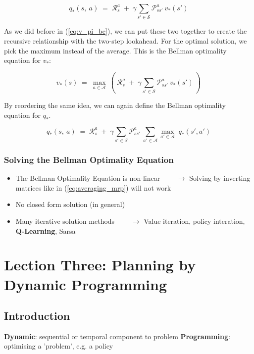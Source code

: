 \documentclass[10pt]{article}
\begin{document}
\begin{equation}
q_{*}(s,\:a)\;=\;\mathcal{R}_{s}^{a}\;+\;\gamma \sum_{s' \in \mathcal{S}} \mathcal{P}_{ss'}^{a}\:v_{*}(s')
\end{equation}

As we did before in (\ref{eq:v_pi_be}), we can put these two together to create the recursive relationship with the two-step lookahead. For the optimal solution, we pick the maximum instead of the average. This is the Bellman optimality equation for $v_{*}$:

\begin{equation}
v_{*}(s)\;=\;\mathop{max}_{a \in \mathcal{A}}\: \left( \: \mathcal{R}_{s}^{a}\;+\;\gamma \sum_{s' \in \mathcal{S}} \mathcal{P}_{ss'}^{a}\:v_{*}(s') \: \right)
\end{equation}

By reordering the same idea, we can again define the Bellman optimality equation for $q_{*}$. 

\begin{equation}
q_{*}(s,\:a)\;=\;\mathcal{R}_{s}^{a}\;+\;\gamma \sum_{s' \in \mathcal{S}} \mathcal{P}_{ss'}^{a}\: \sum_{a' \in \mathcal{A}} \mathop{max}_{a' \in \mathcal{A}} \; q_{*}(s', a')
\end{equation}

\subsubsection*{Solving the Bellman Optimality Equation}

\begin{itemize}
\item The Bellman Optimality Equation is non-linear \newline
$\qquad \rightarrow$ Solving by inverting matrices like in (\ref{eq:averaging_mrp}) will not work
\item No closed form solution (in general)
\item Many iterative solution methods \newline
$\qquad \rightarrow$ Value iteration, policy interation, \textbf{Q-Learning}, Sarsa
\end{itemize}
\newpage

\section{Lection Three: Planning by Dynamic Programming}
\subsection{Introduction}
\textbf{Dynamic}: sequential or temporal component to problem \newline
\textbf{Programming}: optimising a 'problem', e.g. a policy\newline
\end{document}
